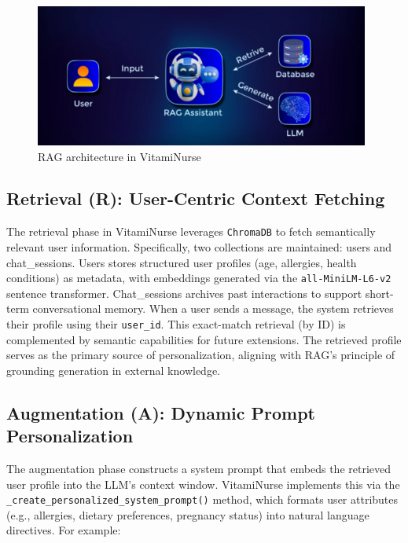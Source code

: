 \begin{center}
\begin{figure}[H]
\includegraphics[width=0.98\textwidth]{images/RAG_logic.png}
\caption{RAG architecture in VitamiNurse} 
\label{fig:RAG_architecture}
\end{figure}
\end{center}

\subsection{Retrieval (R): User-Centric Context Fetching}
\label{subsec:retrieval}

The retrieval phase in VitamiNurse leverages \texttt{ChromaDB} to fetch semantically relevant user information. 
Specifically, two collections are maintained: users and chat\_sessions. Users stores structured user profiles (age, allergies, health conditions) as metadata, with embeddings generated via the \texttt{all-MiniLM-L6-v2} sentence transformer. 
Chat\_sessions archives past interactions to support short-term conversational memory. When a user sends a message, the system retrieves their profile using their \texttt{user\_id}. This exact-match retrieval (by ID) is complemented by semantic capabilities for future extensions. The retrieved profile serves as the primary source of personalization, aligning with RAG’s principle of grounding generation in external knowledge\cite{rag2020}.

\subsection{Augmentation (A): Dynamic Prompt Personalization}
\label{subsec:augmentation}

The augmentation phase constructs a system prompt that embeds the retrieved user profile into the LLM’s context window. VitamiNurse implements this via the \texttt{\_create\_personalized\_system\_prompt()} method, which formats user attributes (e.g., allergies, dietary preferences, pregnancy status) into natural language directives. For example:

